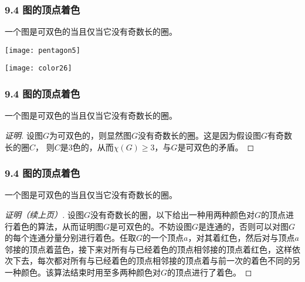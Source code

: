 \documentclass{beamer}
\begin{document}
\begin{CJK}{UTF8}{gbsn}
\begin{frame}
  \frametitle{9.4 图的顶点着色}
  \begin{Thm2}
    一个图是可双色的当且仅当它没有奇数长的圈。
  \end{Thm2}
\vspace{1cm}
  \begin{minipage}{0.45\linewidth}
\texttt{[image: pentagon5]}    
  \end{minipage}
  \begin{minipage}{0.45\linewidth}
    \texttt{[image: color26]}
  \end{minipage}
\end{frame}

\begin{frame}
  \frametitle{9.4 图的顶点着色}
  \begin{Thm2}
    一个图是可双色的当且仅当它没有奇数长的圈。
  \end{Thm2}
  \begin{proof}[证明]
    设图$G$为可双色的，则显然图$G$没有奇数长的圈。这是因为假设图$G$有奇数长的圈$C$，
  则$C$是3色的，从而$\chi(G) \geq 3$，与$G$是可双色的矛盾。  
  \end{proof}
\end{frame}

\begin{frame}
  \frametitle{9.4 图的顶点着色}
  \begin{Thm2}
    一个图是可双色的当且仅当它没有奇数长的圈。
  \end{Thm2}
  \begin{proof}[证明（续上页）]
   

  设图$G$没有奇数长的圈，以下给出一种用两种颜色对$G$的顶点进行着色的算法，从而证明图$G$是可双色的。不妨设图$G$是连通的，否则可以对图$G$的每个连通分量分别进行着色。任取$G$的一个顶点$a$，对其着红色，然后对与顶点$a$邻接的顶点着蓝色，接下来对所有与已经着色的顶点相邻接的顶点着红色，这样依次下去，每次都对所有与已经着色的顶点相邻接的顶点着与前一次的着色不同的另一种颜色。该算法结束时用至多两种颜色对$G$的顶点进行了着色。
  

\end{proof}
\end{frame}
\end{CJK}
\end{document}

